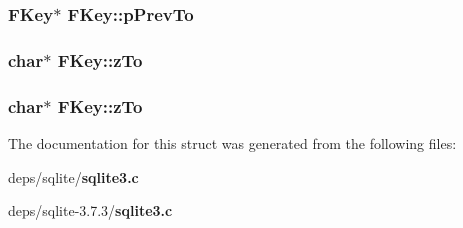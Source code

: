 \subsubsection{\setlength{\rightskip}{0pt plus 5cm}\bf{FKey}$\ast$ \bf{FKey::p\-Prev\-To}}\label{structFKey_997b06468f0a3187ca907072c1a129ea}


\subsubsection{\setlength{\rightskip}{0pt plus 5cm}char$\ast$ \bf{FKey::z\-To}}\label{structFKey_bf78a5c63ecec8ab90f00f6350a08a1e}


\subsubsection{\setlength{\rightskip}{0pt plus 5cm}char$\ast$ \bf{FKey::z\-To}}\label{structFKey_bf78a5c63ecec8ab90f00f6350a08a1e}




The documentation for this struct was generated from the following files:\begin{CompactItemize}
\item 
deps/sqlite/\bf{sqlite3.c}\item 
deps/sqlite-3.7.3/\bf{sqlite3.c}\end{CompactItemize}
